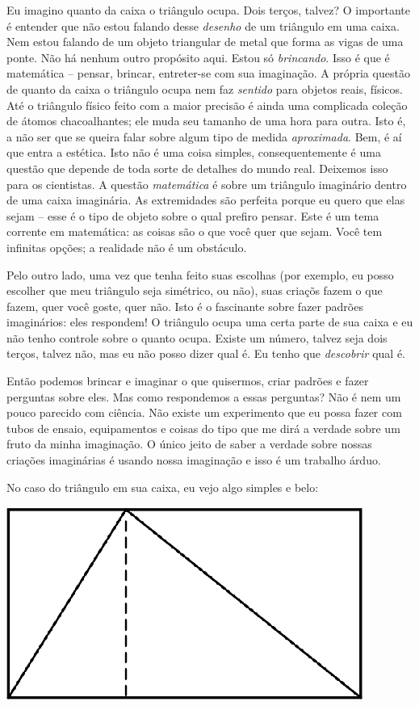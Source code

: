 \documentclass[a4paper,oneside,10pt,notitlepage]{article}
\begin{document}
Eu imagino quanto da caixa o triângulo ocupa.
Dois terços, talvez?
O importante é entender que não estou falando desse \textsl{desenho} de um triângulo em uma caixa.
Nem estou falando de um objeto triangular de metal que forma as vigas de uma ponte. %
Não há nenhum outro propósito aqui.
Estou só \textsl{brincando}.
Isso é que é matemática -- pensar, brincar, entreter-se com sua imaginação.
A própria questão de quanto da caixa o triângulo ocupa nem faz \textsl{sentido} para objetos reais, físicos.
Até o triângulo físico feito com a maior precisão é ainda uma complicada coleção de átomos chacoalhantes; ele muda seu tamanho de uma hora para outra.
Isto é, a não ser que se queira falar sobre algum tipo de medida \textsl{aproximada}.
Bem, é aí que entra a estética.
Isto não é uma coisa simples, consequentemente é uma questão que depende de toda sorte de detalhes do mundo real.
Deixemos isso para os cientistas.
A questão \textsl{matemática} é sobre um triângulo imaginário dentro de uma caixa imaginária.
As extremidades são perfeita porque eu quero que elas sejam -- esse é o tipo de objeto sobre o qual prefiro pensar.
Este é um tema corrente em matemática: as coisas são o que você quer que sejam.
Você tem infinitas opções; a realidade não é um obstáculo.

Pelo outro lado, uma vez que tenha feito suas escolhas (por exemplo, eu posso escolher que meu triângulo seja simétrico, ou não), suas criaçõs fazem o que fazem, quer você goste, quer não.
Isto é o fascinante sobre fazer padrões imaginários: eles respondem!
O triângulo ocupa uma certa parte de sua caixa e eu não tenho controle sobre o quanto ocupa.
Existe um número, talvez seja dois terços, talvez não, mas eu não posso dizer qual é.
Eu tenho que \textsl{descobrir} qual é.

Então podemos brincar e imaginar o que quisermos, criar padrões e fazer perguntas sobre eles.
Mas como respondemos a essas perguntas?
Não é nem um pouco parecido com ciência.
Não existe um experimento que eu possa fazer com tubos de ensaio, equipamentos e coisas do tipo que me dirá a verdade sobre um fruto da minha imaginação.
O único jeito de saber a verdade sobre nossas criações imaginárias é usando nossa imaginação e isso é um trabalho árduo.

No caso do triângulo em sua caixa, eu vejo algo simples e belo:

\begin{center}
\includegraphics{triangle1.eps}
\end{center}
\end{document}
